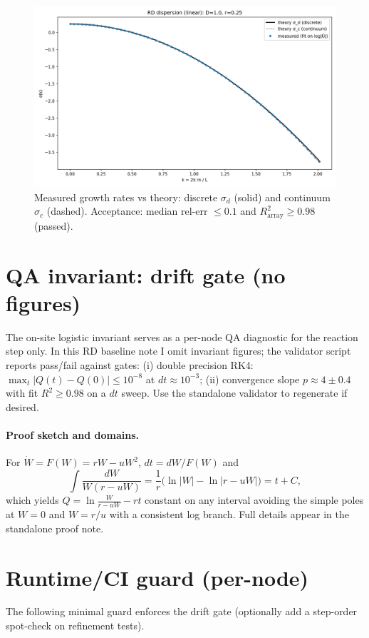 \documentclass[11pt]{article}
\begin{document}
\begin{figure}[t]
\centering
\includegraphics[width=0.9\linewidth]{figs/rd_dispersion.png}
\caption{Measured growth rates vs theory: discrete $\sigma_d$ (solid) and continuum $\sigma_c$ (dashed). Acceptance: median rel-err $\le 0.1$ and $R^2_{\text{array}}\ge 0.98$ (passed).}
\label{fig:disp}
\end{figure}

\section{QA invariant: drift gate (no figures)}
The on-site logistic invariant serves as a per-node QA diagnostic for the reaction step only. In this RD baseline note I omit invariant figures; the validator script reports pass/fail against gates:
(i) double precision RK4: $\max_t |Q(t)-Q(0)| \le 10^{-8}$ at $dt\approx 10^{-3}$; (ii) convergence slope $p\approx 4\pm 0.4$ with fit $R^2\ge 0.98$ on a $dt$ sweep. Use the standalone validator to regenerate if desired.

\paragraph{Proof sketch and domains.}
For $\dot W=F(W)=rW-uW^2$, $dt = dW/F(W)$ and
\[
\int \frac{dW}{W(r-uW)}=\frac{1}{r}\Big(\ln|W|-\ln|r-uW|\Big)=t+C,
\]
which yields $Q=\ln\!\frac{W}{r-uW}-rt$ constant on any interval avoiding the simple poles at $W=0$ and $W=r/u$ with a consistent log branch. Full details appear in the standalone proof note.

\section{Runtime/CI guard (per-node)}
The following minimal guard enforces the drift gate (optionally add a step-order spot-check on refinement tests).
\end{document}
